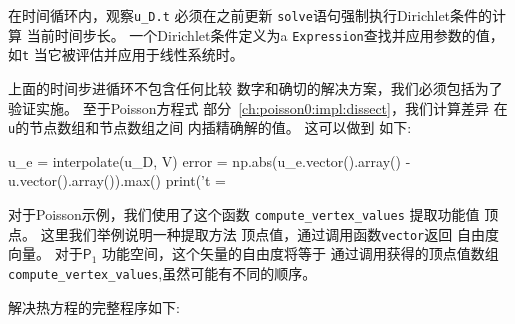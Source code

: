 \begin{notice}[记住用当前时间更新表达式对象!]
在时间循环内，观察\verb!u_D.t! 必须在之前更新
\texttt{solve}语句强制执行Dirichlet条件的计算
当前时间步长。 一个Dirichlet条件定义为a
\texttt{Expression}查找并应用参数的值，如\texttt{t}
当它被评估并应用于线性系统时。
\end{notice}

上面的时间步进循环不包含任何比较
数字和确切的解决方案，我们必须包括为了
验证实施。 至于Poisson方程式
部分~\ref{ch:poisson0:impl:dissect}，我们计算差异
在\texttt{u}的节点数组和节点数组之间
内插精确解的值。 这可以做到
如下:

\begin{python}
u_e = interpolate(u_D, V)
error = np.abs(u_e.vector().array() - u.vector().array()).max()
print('t = %
\end{python}
对于Poisson示例，我们使用了这个函数
\verb!compute_vertex_values! 提取功能值
顶点。 这里我们举例说明一种提取方法
顶点值，通过调用函数\texttt{vector}返回
自由度向量。 对于$\mathsf{P}_1$
功能空间，这个矢量的自由度将等于
通过调用获得的顶点值数组
\verb!compute_vertex_values!,虽然可能有不同的顺序。

解决热方程的完整程序如下:


